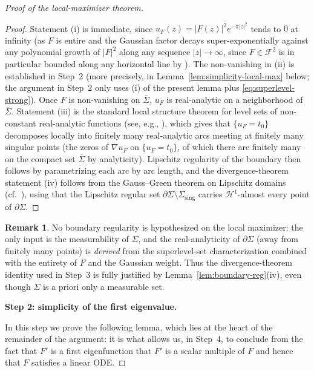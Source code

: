\documentclass[a4paper,11pt,reqno]{amsart}
\numberwithin{equation}{section}
\theoremstyle{plain} %
\theoremstyle{definition} %
\newtheorem{remark}{Remark}[section]
\theoremstyle{remark}
\begin{document}
\begin{proof}[Proof of the local-maximizer theorem]
\begin{proof}
Statement (i) is immediate, since \(u_F(z)=|F(z)|^2 e^{-\pi|z|^2}\) tends to
\(0\) at infinity (as \(F\) is entire and the Gaussian factor decays
super-exponentially against any polynomial growth of \(|F|^2\) along any
sequence \(|z|\to\infty\), since \(F\in\mathcal F^2\) is in particular bounded
along any horizontal line by \cite[Ch.~1]{Folland}). The non-vanishing in
(ii) is established in Step~2 (more precisely, in
Lemma~\ref{lem:simplicity-local-max} below; the argument in Step~2 only uses
(i) of the present lemma plus \eqref{eq:superlevel-strong}). Once \(F\) is
non-vanishing on \(\overline\Sigma\), \(u_F\) is real-analytic on a
neighborhood of \(\overline\Sigma\). Statement (iii) is the standard local
structure theorem for level sets of non-constant real-analytic functions
(see, e.g., \cite{Krantz-Parks-Primer,Lojasiewicz}), which gives that
\(\{u_F=t_0\}\) decomposes locally into finitely many real-analytic arcs
meeting at finitely many singular points (the zeros of \(\nabla u_F\) on
\(\{u_F=t_0\}\), of which there are finitely many on the compact set
\(\overline\Sigma\) by analyticity). Lipschitz regularity of the boundary
then follows by parametrizing each arc by arc length, and the
divergence-theorem statement (iv) follows from the Gauss--Green theorem on
Lipschitz domains
(cf.\ \cite{Evans-Gariepy}), using that the Lipschitz regular set
\(\partial\Sigma\setminus \Sigma_{\mathrm{sing}}\) carries
\(\mathcal H^1\)-almost every point of \(\partial\Sigma\).
\end{proof}

\begin{remark}\label{rem:reg-vs-hypothesis}
No boundary regularity is hypothesized on the local maximizer: the only input
is the measurability of \(\Sigma\), and the real-analyticity of
\(\partial\Sigma\) (away from finitely many points) is \emph{derived} from
the superlevel-set characterization combined with the entirety of \(F\) and
the Gaussian weight. Thus the divergence-theorem identity used in Step~3 is
fully justified by Lemma~\ref{lem:boundary-reg}(iv), even though \(\Sigma\)
is a priori only a measurable set.
\end{remark}

\medskip
\noindent
{\bf Step 2: simplicity of the first eigenvalue.}\label{step:simplicity}

In this step we prove the following lemma, which lies at the heart of the
remainder of the argument: it is what allows us, in Step~4, to conclude from
the fact that \(F'\) is a first eigenfunction that \(F'\) is a scalar multiple
of \(F\) and hence that \(F\) satisfies a linear ODE.


\end{proof}
\end{document}

